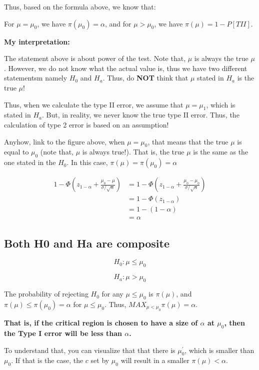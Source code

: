 \documentclass[]{book}
\begin{document}
Thus, based on the formula above, we know that:

For \(\mu=\mu_0\), we have \(\pi(\mu_0)=\alpha\), and for \(\mu >\mu_0\), we have \(\pi(\mu)=1-P[TII]\).

\textbf{My interpretation:}

The statement above is about power of the test. Note that, \(\mu\) is always the true \(\mu\). However, we do not know what the actual value is, thus we have two different statementsm namely \(H_0\) and \(H_a\). Thus, do \textbf{NOT} think that \(\mu\) stated in \(H_a\) is the true \(\mu\)!

Thus, when we calculate the type II error, we assume that \(\mu=\mu_1\), which is stated in \(H_a\). But, in reality, we never know the true type II error. Thus, the calculation of type 2 error is based on an assumption!

Anyhow, link to the figure above, when \(\mu=\mu_0\), that means that the true \(\mu\) is equal to \(\mu_0\) (note that, \(\mu\) is always true!). That is, the true \(\mu\) is the same as the one stated in the \(H_0\). In this case, \(\pi(\mu)=\pi(\mu_0)=\alpha\)

\[\begin{aligned} 1-\Phi(z_{1-\alpha} +\frac{\mu_0-\mu}{\sigma/\sqrt{n}}) &=1-\Phi(z_{1-\alpha} +\frac{\mu_0-\mu_0}{\sigma/\sqrt{n}}) \\ &=1-\Phi(z_{1-\alpha}) \\&=1-(1-\alpha) \\ &=\alpha  \end{aligned}\]

\hypertarget{both-h0-and-ha-are-composite}{%
\subsection{Both H0 and Ha are composite}\label{both-h0-and-ha-are-composite}}

\[H_0: \mu \leq \mu_0\]

\[H_a: \mu > \mu_0\]

The probability of rejecting \(H_0\) for any \(\mu \leq \mu_0\) is \(\pi (\mu)\), and \(\pi(\mu) \leq \pi (\mu_0)=\alpha\) for \(\mu \leq \mu_0\). Thus, \(MAX_{\mu <\mu_0} \pi(\mu)=\alpha\).

\textbf{That is, if the critical region is chosen to have a size of \(\alpha\) at \(\mu_0\), then the Type I error will be less than \(\alpha\).}

To understand that, you can visualize that that there is \(\mu_0^{'}\), which is smaller than \(\mu_0\). If that is the case, the \(c\) set by \(\mu_0\) will result in a smaller \(\pi(\mu) <\alpha\).
\end{document}
